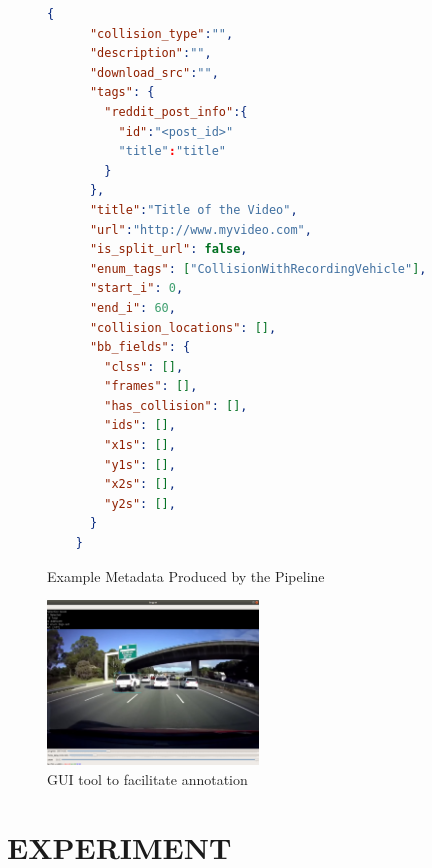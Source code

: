 \documentclass[letterpaper, 10 pt, conference]{IEEEconf}
\begin{document}
\begin{figure}
  \begin{lstlisting}[language=json]
    {
      "collision_type":"",
      "description":"",
      "download_src":"",
      "tags": {
        "reddit_post_info":{
          "id":"<post_id>"
          "title":"title"
        }
      },
      "title":"Title of the Video",
      "url":"http://www.myvideo.com",
      "is_split_url": false,
      "enum_tags": ["CollisionWithRecordingVehicle"],
      "start_i": 0,
      "end_i": 60,
      "collision_locations": [],
      "bb_fields": {
        "clss": [],
        "frames": [],
        "has_collision": [],
        "ids": [],
        "x1s": [],
        "y1s": [],
        "x2s": [],
        "y2s": [],
      }
    }
  \end{lstlisting}
    \caption{Example Metadata Produced by the Pipeline}
    \label{metadata_example}
\end{figure}

\begin{figure}[htpb]
		\centering
    \includegraphics[width=0.5\textwidth]{example_gui_tool.png}
		\caption{GUI tool to facilitate annotation}
		\label{fig:example_gui_tool-png}
\end{figure}

\section{EXPERIMENT}
\end{document}
